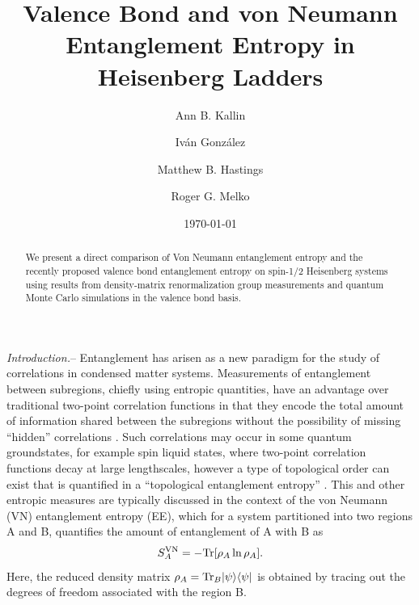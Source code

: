 \documentclass[prl,aps,twocolumn,floatfix,amsmath,amssymb,superscriptaddress,tightenlines]{revtex4}
\begin{document}
\date{\today}
\title{Valence Bond and von Neumann Entanglement Entropy in Heisenberg Ladders}
\author{Ann B. Kallin}

\author{Iv\'an Gonz\'alez}

\author{Matthew B. Hastings}

\author{Roger G. Melko}

\begin{abstract}
We present a direct comparison of Von Neumann entanglement entropy and the recently proposed valence bond entanglement entropy on spin-1/2 Heisenberg systems using results from density-matrix renormalization group measurements and quantum Monte Carlo simulations in the valence bond basis.
\end{abstract}
\maketitle


{\it Introduction.}-- Entanglement has arisen 
as a new paradigm for the study of correlations in condensed matter systems.  
Measurements
of entanglement between subregions, chiefly using entropic
quantities, have an advantage over traditional two-point correlation
functions in that they encode the total amount of information shared
between the subregions without the possibility of missing ``hidden''
correlations \cite{wolf}.  
Such correlations may occur in some quantum groundstates,  for example spin liquid states, 
where two-point correlation functions decay at large lengthscales, however a type of topological order can exist that is quantified in a ``topological entanglement
entropy''  \cite{ KP, LW}.
This and other entropic measures are typically discussed in the context of
the von Neumann (VN) entanglement entropy (EE), which for a system partitioned into
two regions A and B, quantifies the amount of entanglement of A with B as
\begin{equation} 
S^{\rm VN}_A = - {\rm Tr} [ \rho_A \ln \rho_A ]. \label{vNEE} 
\end{equation}
Here, the reduced density matrix $\rho_A = {\rm Tr}_B | \psi \rangle
\langle \psi |$ is obtained by tracing out the degrees of freedom
associated with the region B.
\end{document}
